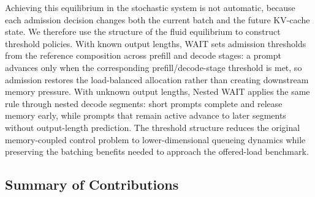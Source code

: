 Achieving this equilibrium in the stochastic system is not automatic, because each admission decision changes both the current batch and the future KV-cache state. We therefore use the structure of the fluid equilibrium to construct threshold policies. With known output lengths, WAIT sets admission thresholds from the reference composition across prefill and decode stages: a prompt advances only when the corresponding prefill/decode-stage threshold is met, so admission restores the load-balanced allocation rather than creating downstream memory pressure. With unknown output lengths, Nested WAIT applies the same rule through nested decode segments: short prompts complete and release memory early, while prompts that remain active advance to later segments without output-length prediction. The threshold structure reduces the original memory-coupled control problem to lower-dimensional queueing dynamics while preserving the batching benefits needed to approach the offered-load benchmark.

\subsection{Summary of Contributions}

